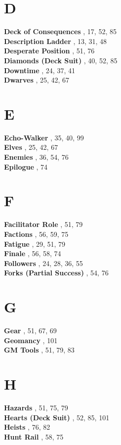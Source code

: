 \section*{D}
\textbf{Deck of Consequences} , 17, 52, 85\\
\textbf{Description Ladder} , 13, 31, 48\\
\textbf{Desperate Position} , 51, 76\\
\textbf{Diamonds (Deck Suit)} , 40, 52, 85\\
\textbf{Downtime} , 24, 37, 41\\
\textbf{Dwarves} , 25, 42, 67\\

\section*{E}
\textbf{Echo-Walker} , 35, 40, 99\\
\textbf{Elves} , 25, 42, 67\\
\textbf{Enemies} , 36, 54, 76\\
\textbf{Epilogue} , 74\\

\section*{F}
\textbf{Facilitator Role} , 51, 79\\
\textbf{Factions} , 56, 59, 75\\
\textbf{Fatigue} , 29, 51, 79\\
\textbf{Finale} , 56, 58, 74\\
\textbf{Followers} , 24, 28, 36, 55\\
\textbf{Forks (Partial Success)} , 54, 76\\

\section*{G}
\textbf{Gear} , 51, 67, 69\\
\textbf{Geomancy} , 101\\
\textbf{GM Tools} , 51, 79, 83\\

\section*{H}
\textbf{Hazards} , 51, 75, 79\\
\textbf{Hearts (Deck Suit)} , 52, 85, 101\\
\textbf{Heists} , 76, 82\\
\textbf{Hunt Rail} , 58, 75\\

